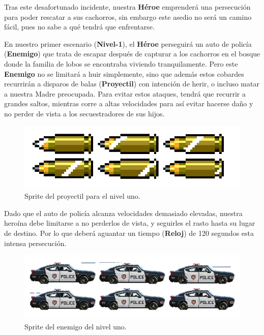 \documentclass{article}
\begin{document}
Tras este desafortunado incidente, nuestra \textbf{Héroe} emprenderá una persecución para poder rescatar a sus cachorros, sin embargo este asedio no será un camino fácil, pues no sabe a qué tendrá que enfrentarse.



En nuestro primer escenario (\textbf{Nivel-1}), el \textbf{Héroe} perseguirá un auto de policía (\textbf{Enemigo}) que trata de escapar después de capturar a los cachorros en el bosque donde la familia de lobos se encontraba viviendo tranquilamente. Pero este \textbf{Enemigo} no se limitará a huir simplemente, sino que además estos cobardes recurrirán a disparos de balas (\textbf{Proyectil}) con intención de herir, o incluso matar a nuestra Madre preocupada. Para evitar estos ataques, tendrá que recurrir a grandes saltos, mientras corre a altas velocidades para así evitar hacerse daño y no perder de vista a los secuestradores de sus hijos.

\begin{figure}[h]
\includegraphics[scale=0.7]{Images/spriteproyectil.png}
\centering
\caption{Sprite del proyectil para el nivel uno.}
\label{fig:spriteproy}
\end{figure}

Dado que el auto de policía alcanza velocidades demasiado elevadas, nuestra heroína debe limitarse a no perderlos de vista, y seguirles el rasto hasta su lugar de destino. Por lo que deberá aguantar un tiempo (\textbf{Reloj}) de 120 segundos esta intensa persecución.

\begin{figure}[h]
\includegraphics[scale=0.4]{Images/spritecarro.png}
\centering
\caption{Sprite del enemigo del nivel uno.}
\label{fig:spriteproy}
\end{figure}
\end{document}
